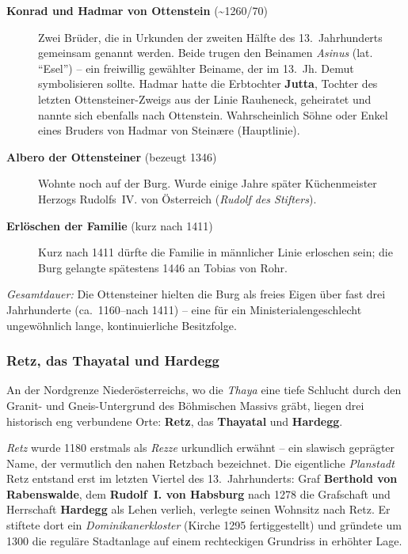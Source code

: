 \begin{description}
  \item[\textbf{Konrad und Hadmar von Ottenstein} (\textasciitilde{}1260/70)] Zwei Brüder, die in Urkunden der zweiten Hälfte des 13.~Jahrhunderts gemeinsam genannt werden. Beide trugen den Beinamen \textit{Asinus} (lat. \enquote{Esel}) -- ein freiwillig gewählter Beiname, der im 13.~Jh. Demut symbolisieren sollte. Hadmar hatte die Erbtochter \textbf{Jutta}, Tochter des letzten Ottensteiner-Zweigs aus der Linie Rauheneck, geheiratet und nannte sich ebenfalls nach Ottenstein. Wahrscheinlich Söhne oder Enkel eines Bruders von Hadmar von Steinære (Hauptlinie). \cite{burgen_austria_ottenstein,schneider_ottenstein}

  \item[\textbf{Albero der Ottensteiner} (bezeugt 1346)] Wohnte noch auf der Burg. Wurde einige Jahre später Küchenmeister Herzogs Rudolfs~IV. von Österreich (\textit{Rudolf des Stifters}). \cite{burgen_austria_ottenstein}

  \item[\textbf{Erlöschen der Familie} (kurz nach 1411)] Kurz nach 1411 dürfte die Familie in männlicher Linie erloschen sein; die Burg gelangte spätestens 1446 an Tobias von Rohr. \cite{noe_burgen_online_ottenstein}
\end{description}

\medskip
\noindent\textit{Gesamtdauer:} Die Ottensteiner hielten die Burg als freies Eigen über fast drei Jahrhunderte (ca.~1160--nach 1411) -- eine für ein Ministerialengeschlecht ungewöhnlich lange, kontinuierliche Besitzfolge.

\subsubsection{Retz, das Thayatal und Hardegg}\label{retz_und_thaya}

An der Nordgrenze Niederösterreichs, wo die \textit{Thaya} eine tiefe Schlucht durch den Granit- und Gneis-Untergrund des Böhmischen Massivs gräbt, liegen drei historisch eng verbundene Orte: \textbf{Retz}, das \textbf{Thayatal} und \textbf{Hardegg}. \cite{kacetl_thayatal}

\textit{Retz} wurde 1180 erstmals als \textit{Rezze} urkundlich erwähnt -- ein slawisch geprägter Name, der vermutlich den nahen Retzbach bezeichnet. Die eigentliche \textit{Planstadt} Retz entstand erst im letzten Viertel des 13.~Jahrhunderts: Graf \textbf{Berthold von Rabenswalde}, dem \textbf{Rudolf~I. von Habsburg} nach 1278 die Grafschaft und Herrschaft \textbf{Hardegg} als Lehen verlieh, verlegte seinen Wohnsitz nach Retz. Er stiftete dort ein \textit{Dominikanerkloster} (Kirche 1295 fertiggestellt) und gründete um 1300 die reguläre Stadtanlage auf einem rechteckigen Grundriss in erhöhter Lage. \cite{kacetl_thayatal}

